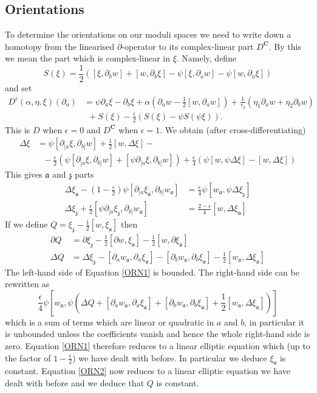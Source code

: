 \documentclass[11pt]{amsart}
\newcommand{\CC}{\mathbf{C}}
\newcommand{\dbar}{\overline{\partial}}
\renewcommand{\aa}{\mathfrak{a}}
\newcommand{\zz}{\mathfrak{z}}
\renewcommand{\Upsilon}{S}
\newcommand{\orvar}{Q}
\numberwithin{equation}{section}
\theoremstyle{definition}
\theoremstyle{remark}
\begin{document}
\subsection{Orientations}\label{orient}

To determine the orientations on our moduli spaces we need to write down a homotopy from the linearised $\dbar$-operator to its com\-plex-linear part $D^{\CC}$. By this we mean the part which is complex-linear in $\xi$. Namely, define
\[\Upsilon(\xi)=\frac{1}{2}\left([\xi,\partial_bw]+[w,\partial_b\xi]-\psi[\xi,\partial_aw]-\psi[w,\partial_a\xi]\right)\]
and set
\begin{align}\label{orient-eq}
D^{\epsilon}(\alpha,\eta,\xi)(\partial_a)&=\psi\partial_a\xi-\partial_b\xi+\alpha\left(\partial_aw-\frac{1}{2}[w,\partial_aw]\right)+\frac{1}{\tau_2}\left(\eta_1\partial_aw+\eta_2\partial_bw\right)\\
\nonumber&\ \ +\Upsilon(\xi)-\frac{\epsilon}{2}(\Upsilon(\xi)-\psi \Upsilon(\psi\xi)).
\end{align}
This is $D$ when $\epsilon=0$ and $D^{\CC}$ when $\epsilon=1$. We obtain (after cross-differen\-tia\-ting)
\begin{align*}
\Delta\xi&=\psi[\partial_{[a}\xi,\partial_{b]}w]+\frac{1}{2}[w,\Delta\xi]-\\
&\ \ \ -\frac{\epsilon}{2}\left(\psi[\partial_{[a}\xi,\partial_{b]}w]+[\psi\partial_{[a}\xi,\partial_{b]}w]\right)+\frac{\epsilon}{4}\left(\psi[w,\psi\Delta\xi]-[w,\Delta\xi]\right)
\end{align*}
This gives $\aa$ and $\zz$ parts
\begin{align}
\label{ORN1}\Delta\xi_{\aa}-\left(1-\frac{\epsilon}{2}\right)\psi[\partial_{[a}\xi_{\aa},\partial_{b]}w_{\aa}]&=\frac{\epsilon}{4}\psi[w_{\aa},\psi\Delta\xi_{\zz}]\\
\label{ORN2}\Delta\xi_{\zz}+\frac{\epsilon}{2}[\psi\partial_{[a}\xi_{\zz},\partial_{b]}w_{\aa}]&=\frac{2-\epsilon}{4}[w,\Delta\xi_{\aa}]
\end{align}
If we define $\orvar=\xi_{\zz}-\frac{1}{2}[w,\xi_{\aa}]$ then
\begin{align*}
\partial \orvar&=\partial\xi_{\zz}-\frac{1}{2}[\partial w,\xi_{\aa}]-\frac{1}{2}[w,\partial\xi_{\aa}]\\
\Delta \orvar&=\Delta\xi_{\zz}-[\partial_aw_{\aa},\partial_a\xi_{\aa}]-[\partial_bw_{\aa},\partial_b\xi_{\aa}]-\frac{1}{2}[w_{\aa},\Delta\xi_{\aa}]
\end{align*}
The left-hand side of Equation \eqref{ORN1} is bounded. The right-hand side can be rewritten as
\[\frac{\epsilon}{4}\psi\left[w_{\aa},\psi\left(\Delta \orvar+[\partial_aw_{\aa},\partial_{a}\xi_{\aa}]+[\partial_bw_{\aa},\partial_{b}\xi_{\aa}]+\frac{1}{2}[w_{\aa},\Delta\xi_{\aa}]\right)\right]\]
which is a sum of terms which are linear or quadratic in $a$ and $b$, in particular it is unbounded unless the coefficients vanish and hence the whole right-hand side is zero. Equation \eqref{ORN1} therefore reduces to a linear elliptic equation which (up to the factor of $1-\frac{\epsilon}{2}$) we have dealt with before. In particular we deduce $\xi_{\aa}$ is constant. Equation \eqref{ORN2} now reduces to a linear elliptic equation we have dealt with before and we deduce that $\orvar$ is constant.
\end{document}
